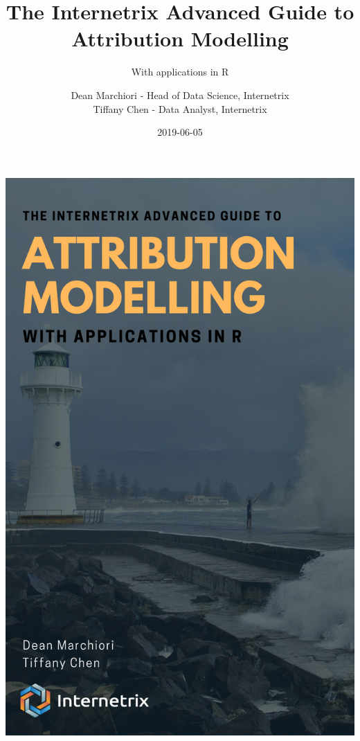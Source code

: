 \documentclass[]{book}
\title{The Internetrix Advanced Guide to Attribution Modelling}
\subtitle{With applications in R}
\author{Dean Marchiori - Head of Data Science, Internetrix \\ Tiffany Chen - Data Analyst, Internetrix}
\date{2019-06-05}
\let\oldmaketitle\maketitle
\begin{document}
\maketitle

\thispagestyle{empty}
\begin{center}
\includegraphics{cover.png}
\end{center}

\let\maketitle\oldmaketitle
\maketitle
\end{document}
